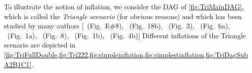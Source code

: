 To illustrate the notion of inflation, we consider the DAG of \cref{fig:TriMainDAG}, which is called the {\em Triangle scenario} (for obvious reasons) and which has been studied by many authors [\citealp{pusey2014gdag}~(Fig.~E\#8), \citealp{WoodSpekkens}~(Fig.~18b), \citealp{fritz2012bell}~(Fig.~3), \citealp{chaves2014novel}~(Fig.~6a), \citealp{Chaves2015infoquantum}~(Fig.~1a), \citealp{BilocalCorrelations}~(Fig.~8), \citealp{steudel2010ancestors}~(Fig.~1b), \citealp{chaves2014informationinference}~(Fig.~4b)]
Different inflations of the Triangle scenario are depicted in \cref{fig:TriFullDouble,fig:Tri222,fig:simpleinflation,fig:simplestinflation,fig:TriDagSubA2B1C1}.

